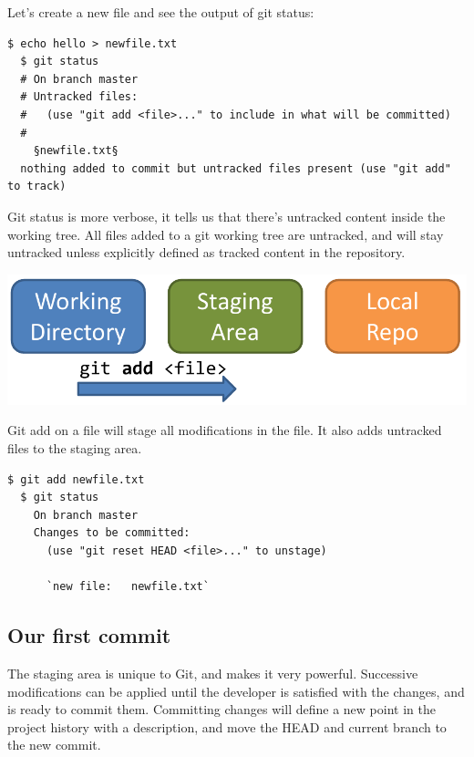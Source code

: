 \documentclass{../common/tufte-latex/tufte-handout}
\begin{document}
Let's create a new file and see the output of git status:

\begin{lstlisting}[style=BashInputStyle]
  $ echo hello > newfile.txt
  $ git status
  # On branch master
  # Untracked files:
  #   (use "git add <file>..." to include in what will be committed)
  #
    §newfile.txt§
  nothing added to commit but untracked files present (use "git add" to track)
\end{lstlisting}

Git status is more verbose, it tells us that there's untracked content inside the working tree.
All files added to a git working tree are untracked, and will stay untracked unless explicitly defined as tracked content in the repository.

\begin{marginfigure}%
  \centering
  \includegraphics[width=\linewidth]{gitadd-schema.pdf}
  \label{fig:gitadd}
  \caption{Git add on a file will stage all modifications in the file. It also adds untracked files to the staging area.}
\end{marginfigure}

\begin{lstlisting}[style=BashInputStyle]
  $ git add newfile.txt
  $ git status
    On branch master
    Changes to be committed:
      (use "git reset HEAD <file>..." to unstage)
  
	  `new file:   newfile.txt`
\end{lstlisting}

\subsection{Our first commit}

The staging area is unique to Git, and makes it very powerful.
Successive modifications can be applied until the developer is satisfied with the changes, and is ready to commit them.
Committing changes will define a new point in the project history with a description, and move the HEAD and current branch to the new commit.
\end{document}
